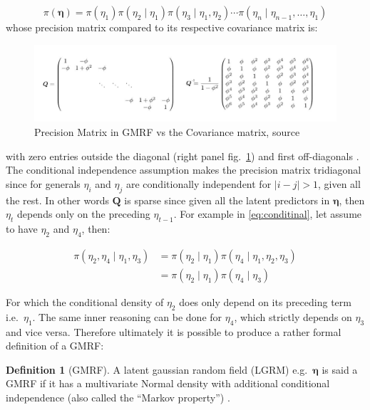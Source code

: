 \documentclass[
  12pt,
  a4paper,
  oneside]{book}
\theoremstyle{definition}
\newtheorem{definition}{Definition}[chapter]
\theoremstyle{definition}
\theoremstyle{definition}
\theoremstyle{remark}
\begin{document}
\[
\pi(\boldsymbol{\eta})=\pi\left(\eta_{1}\right) \pi\left(\eta_{2} \mid \eta_{1}\right) \pi\left(\eta_{3} \mid \eta_{1}, \eta_{2}\right) \cdots \pi\left(\eta_{n} \mid \eta_{n-1}, \ldots, \eta_{1}\right)
\]
whose precision matrix compared to its respective covariance matrix is:

\begin{figure}
\centering
\includegraphics{images/precvscov.jpg}
\caption{\label{fig:precisionmat}Precision Matrix in GMRF vs the Covariance matrix, source \citet{GMRFRue}}
\end{figure}

with zero entries outside the diagonal (right panel fig.~\ref{fig:precisionmat}) and first off-diagonals \citeyearpar{GRMFRue}.
The conditional independence assumption makes the precision matrix tridiagonal since for generals \(\eta_i\) and \(\eta_j\) are conditionally independent for \(|i − j| > 1\), given all the rest. In other words \(\boldsymbol{Q}\) is sparse since given all the latent predictors in \(\boldsymbol\eta\), then \(\eta_t\) depends only on the preceding \(\eta_{t-1}\). For example in \eqref{eq:conditinal}, let assume to have \(\eta_2\) and \(\eta_4\), then:

\begin{equation} 
\begin{split}
  \pi\left(\eta_{2}, \eta_{4} \mid \eta_{1}, \eta_{3}\right) &=\pi\left(\eta_{2} \mid \eta_{1}\right) \pi\left(\eta_{4} \mid \eta_{1}, \eta_{2}, \eta_{3}\right) \\
  & =\pi\left(\eta_{2} \mid \eta_{1}\right) \pi\left(\eta_{4} \mid \eta_{3}\right)
\end{split}
\label{eq:conditinal}
\end{equation}

For which the conditional density of \(\eta_2\) does only depend on its preceding term i.e.~\(\eta_1\). The same inner reasoning can be done for \(\eta_4\), which strictly depends on \(\eta_3\) and vice versa.
Therefore ultimately it is possible to produce a rather formal definition of a GMRF:

\begin{definition}[GMRF]
\protect\hypertarget{def:gmrf}{}{\label{def:gmrf} {} }A latent gaussian random field (LGRM) e.g.~\(\boldsymbol\eta\) is said a GMRF if it has a multivariate Normal density with additional conditional independence (also called the ``Markov property'') \citep{wang2018bayesian}.
\end{definition}
\end{document}
